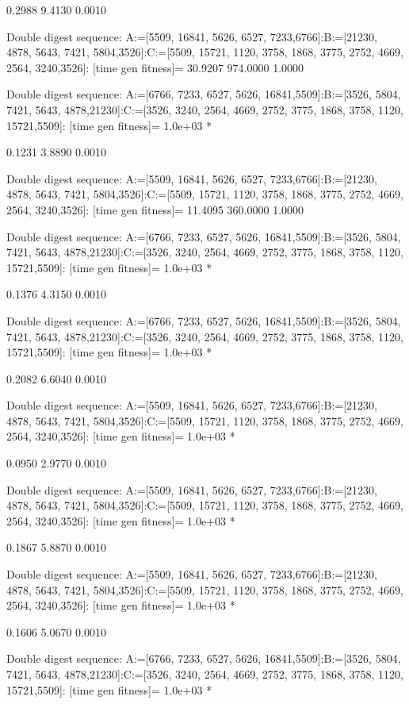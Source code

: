     0.2988    9.4130    0.0010

Double digest sequence:
A:=[5509, 16841, 5626, 6527, 7233,6766]:B:=[21230, 4878, 5643, 7421, 5804,3526]:C:=[5509, 15721, 1120, 3758, 1868, 3775, 2752, 4669, 2564, 3240,3526]:
[time gen fitness]=
   30.9207  974.0000    1.0000

Double digest sequence:
A:=[6766, 7233, 6527, 5626, 16841,5509]:B:=[3526, 5804, 7421, 5643, 4878,21230]:C:=[3526, 3240, 2564, 4669, 2752, 3775, 1868, 3758, 1120, 15721,5509]:
[time gen fitness]=
   1.0e+03 *

    0.1231    3.8890    0.0010

Double digest sequence:
A:=[5509, 16841, 5626, 6527, 7233,6766]:B:=[21230, 4878, 5643, 7421, 5804,3526]:C:=[5509, 15721, 1120, 3758, 1868, 3775, 2752, 4669, 2564, 3240,3526]:
[time gen fitness]=
   11.4095  360.0000    1.0000

Double digest sequence:
A:=[6766, 7233, 6527, 5626, 16841,5509]:B:=[3526, 5804, 7421, 5643, 4878,21230]:C:=[3526, 3240, 2564, 4669, 2752, 3775, 1868, 3758, 1120, 15721,5509]:
[time gen fitness]=
   1.0e+03 *

    0.1376    4.3150    0.0010

Double digest sequence:
A:=[6766, 7233, 6527, 5626, 16841,5509]:B:=[3526, 5804, 7421, 5643, 4878,21230]:C:=[3526, 3240, 2564, 4669, 2752, 3775, 1868, 3758, 1120, 15721,5509]:
[time gen fitness]=
   1.0e+03 *

    0.2082    6.6040    0.0010

Double digest sequence:
A:=[5509, 16841, 5626, 6527, 7233,6766]:B:=[21230, 4878, 5643, 7421, 5804,3526]:C:=[5509, 15721, 1120, 3758, 1868, 3775, 2752, 4669, 2564, 3240,3526]:
[time gen fitness]=
   1.0e+03 *

    0.0950    2.9770    0.0010

Double digest sequence:
A:=[5509, 16841, 5626, 6527, 7233,6766]:B:=[21230, 4878, 5643, 7421, 5804,3526]:C:=[5509, 15721, 1120, 3758, 1868, 3775, 2752, 4669, 2564, 3240,3526]:
[time gen fitness]=
   1.0e+03 *

    0.1867    5.8870    0.0010

Double digest sequence:
A:=[5509, 16841, 5626, 6527, 7233,6766]:B:=[21230, 4878, 5643, 7421, 5804,3526]:C:=[5509, 15721, 1120, 3758, 1868, 3775, 2752, 4669, 2564, 3240,3526]:
[time gen fitness]=
   1.0e+03 *

    0.1606    5.0670    0.0010

Double digest sequence:
A:=[6766, 7233, 6527, 5626, 16841,5509]:B:=[3526, 5804, 7421, 5643, 4878,21230]:C:=[3526, 3240, 2564, 4669, 2752, 3775, 1868, 3758, 1120, 15721,5509]:
[time gen fitness]=
   1.0e+03 *

